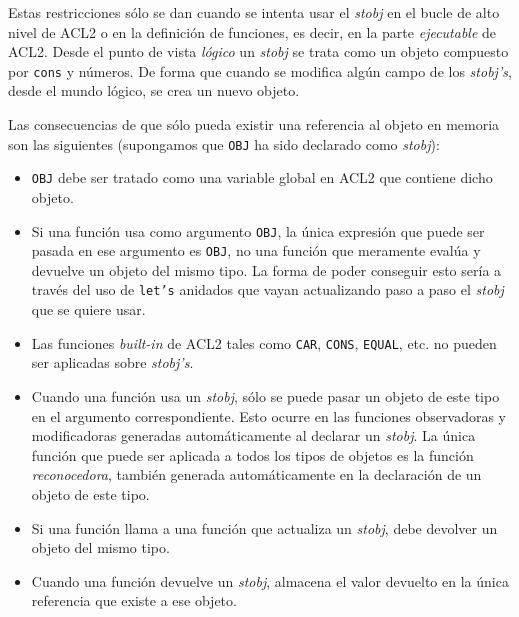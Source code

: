 \documentclass[a4paper,10pt]{article}
\begin{document}
\par \vspace{10pt}

Estas restricciones sólo se dan cuando se intenta usar el \emph{stobj} en el bucle de alto nivel de ACL2 o en la definición de funciones, es decir, en la parte \emph{ejecutable} de ACL2. Desde el punto de vista \emph{lógico} un \emph{stobj} se trata como un objeto compuesto por \texttt{cons} y números. De forma que cuando se modifica algún campo de los \emph{stobj's}, desde el mundo lógico, se crea un nuevo objeto.

\par \vspace{10pt}

Las consecuencias de que sólo pueda existir una referencia al objeto en memoria son las siguientes (supongamos que \texttt{OBJ} ha sido declarado como \emph{stobj}):

\par \vspace{10pt}

\begin{itemize}
	\item \texttt{OBJ} debe ser tratado como una variable global en ACL2 que contiene dicho objeto.
	\item Si una función usa como argumento \texttt{OBJ}, la única expresión que puede ser pasada en ese argumento es \texttt{OBJ}, no una función que meramente evalúa y devuelve un objeto del mismo tipo. La forma de poder conseguir esto sería a través del uso de \texttt{let's} anidados que vayan actualizando paso a paso el \emph{stobj} que se quiere usar.
	\item Las funciones \emph{built-in} de ACL2 tales como \texttt{CAR}, \texttt{CONS}, \texttt{EQUAL}, etc. no pueden ser aplicadas sobre \emph{stobj's}. 
	\item Cuando una función usa un \emph{stobj}, sólo se puede pasar un objeto de este tipo en el argumento correspondiente. Esto ocurre en las funciones observadoras y modificadoras generadas automáticamente al declarar un \emph{stobj}. La única función que puede ser aplicada a todos los tipos de objetos es la función \emph{reconocedora}, también generada automáticamente en la declaración de un objeto de este tipo.
	\item Si una función llama a una función que actualiza un \emph{stobj}, debe devolver un objeto del mismo tipo.
	\item Cuando una función devuelve un \emph{stobj}, almacena el valor devuelto en la única referencia que existe a ese objeto. 
\end{itemize}
\end{document}
